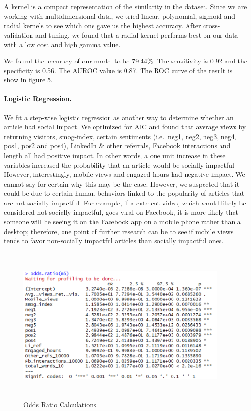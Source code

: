 \documentclass[10pt,letterpaper]{article}
\begin{document}
A kernel is a compact representation of the similarity in the dataset.
Since we are working with multidimensional data, we tried linear,
polynomial, sigmoid and radial kernels to see which one gave us the
highest accuracy. After cross-validation and tuning, we found that a
radial kernel performs best on our data with a low cost and high gamma
value.

We found the accuracy of our model to be 79.44\%. The sensitivity is
0.92 and the specificity is 0.56. The AUROC value is 0.87. The ROC curve
of the result is show in figure 5.

\hypertarget{logistic-regression.}{%
\paragraph{Logistic Regression.}\label{logistic-regression.}}

We fit a step-wise logistic regression as another way to determine
whether an article had social impact. We optimized for AIC and found
that average views by returning visitors, smog-index, certain sentiments
(i.e.~neg1, neg2, neg3, neg4, pos1, pos2 and pos4), LinkedIn \& other
referrals, Facebook interactions and length all had positive impact. In
other words, a one unit increase in these variables increased the
probability that an article would be socially impactful. However,
interestingly, mobile views and engaged hours had negative impact. We
cannot say for certain why this may be the case. However, we suspected
that it could be due to certain human behaviors linked to the popularity
of articles that are not socially impactful. For example, if a cute cat
video, which would likely be considered not socially impactful, goes
viral on Facebook, it is more likely that someone will be seeing it on
the Facebook app on a mobile phone rather than a desktop; therefore, one
point of further research can be to see if mobile views tends to favor
non-socially impactful articles than socially impactful ones.

\begin{figure}
\includegraphics[width=400px,height=300px]{odds-ratio} \caption{Odds Ratio Calculations}\label{fig:unnamed-chunk-6}
\end{figure}
\end{document}
